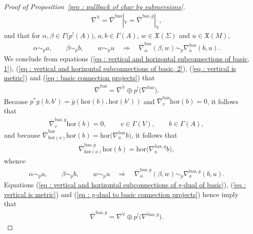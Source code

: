 \documentclass[pdftex]{sigma}
\numberwithin{equation}{section}
\newcommand{\8}{\infty}
\newcommand{\X}{\mathfrak{X}}
\begin{document}
\begin{proof}[Proof of Proposition~\ref{pro : pullback of char by submersions}]
 \begin{gather}\label{eq : vertical is metric}
 \nabla^{\mathbb{V}}=\overline{\nabla}^{\mathrm{bas}}|_{\mathbb{V}} = \overline{\nabla}^{\mathrm{bas},\overline{g}}|_{\mathbb{V}},
 \end{gather}and that for $\alpha,\beta \in \Gamma\big(p^!(A)\big)$, $a,b \in \Gamma(A)$, $w \in \X(\Sigma)$ and $u \in \X(M)$,
\begin{gather}\label{eq : basic connection projects}
 \alpha \sim_p a, \qquad \beta \sim_p b, \qquad w \sim_p u \quad \Longrightarrow \quad \overline{\nabla}^{\mathrm{bas}}_{\alpha}(\beta,w) \sim_p \nabla^{\mathrm{bas}}_{a}(b,u).
\end{gather}We conclude from equations (\ref{eq : vertical and horizontal subconnections of basic, 1}), (\ref{eq : vertical and horizontal subconnections of basic, 2}), (\ref{eq : vertical is metric}) and (\ref{eq : basic connection projects}) that
\begin{gather}\label{eq : basic connection splits}
 \overline{\nabla}^{\mathrm{bas}} = \nabla^{\mathbb{V}} \oplus p^!\big(\nabla^{\mathrm{bas}}\big).
\end{gather}Because $p^*g(b,b')=\overline{g}(\mathrm{hor}(b),\mathrm{hor}(b'))$ and $\overline{\nabla}^{\mathrm{bas}}_v\mathrm{hor}(b)=0$, it follows that
\begin{gather*}
 \overline{\nabla}^{\mathrm{bas},\overline{g}}_v\mathrm{hor}(b) = 0, \qquad v \in \Gamma(V), \qquad b \in \Gamma(A),
\end{gather*}and because $\overline{\nabla}^{\mathrm{bas}}_{\mathrm{hor}(a)}\mathrm{hor}(b) = \mathrm{hor}\big(\nabla^{\mathrm{bas}}_{a}b\big)$, it follows that
\begin{gather*}
 \overline{\nabla}^{\mathrm{bas},\overline{g}}_{\mathrm{hor}(a)}\mathrm{hor}(b) = \mathrm{hor}\big(\nabla^{\mathrm{bas},g}_{a}b\big),
\end{gather*}whence
\begin{gather}\label{eq : g-dual to basic connection projects}
 \alpha \sim_p a, \qquad \beta \sim_p b, \qquad w \sim_p u \quad \Longrightarrow \quad \overline{\nabla}^{\mathrm{bas},\overline{g}}_{\alpha}(\beta,w) \sim_p \nabla^{\mathrm{bas},g}_{a}(b,u).
\end{gather}Equations (\ref{eq : vertical and horizontal subconnections of g-dual of basic}), (\ref{eq : vertical is metric}) and (\ref{eq : g-dual to basic connection projects}) hence imply that
\begin{gather}\label{eq : g-dual to basic connection splits}
 \overline{\nabla}^{\mathrm{bas},\overline{g}} = \nabla^{\mathbb{V}} \oplus p^!\big(\nabla^{\mathrm{bas},g}\big).
\end{gather}


\end{proof}
\end{document}
